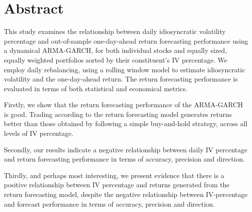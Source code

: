 \chapter{Abstract}
This study examines the relationship between daily idiosyncratic volatility percentage and out-of-sample one-day-ahead return forecasting performance using a dynamical ARMA-GARCH, for both individual stocks and equally sized, equally weighted portfolios sorted by their constituent's IV percentage. We employ daily rebalancing, using a rolling window model to estimate idiosyncratic volatility and the one-day-ahead return. The return forecasting performance is evaluated in terms of both statistical and economical metrics.

Firstly, we show that the return forecasting performance of the ARMA-GARCH is good. Trading according to the return forecasting model generates returns better than those obtained by following a simple buy-and-hold strategy, across all levels of IV percentage. 

Secondly, our results indicate a negative relationship between daily IV percentage and return forecasting performance in terms of accuracy, precision and direction. 

Thirdly, and perhaps most interesting,  we present evidence that there is a positive relationship between IV percentage and returns generated from the return forecasting model, despite the negative relationship between IV-percentage and forecast performance in terms of accuracy, precision and direction.

